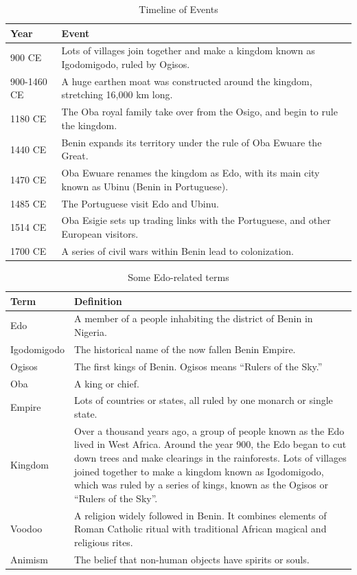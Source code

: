 \begin{table}[htb]
\centering
\caption{Timeline of Events}
\label{tab:timeline}
\begin{tabularx}{\linewidth}{|l|X|}
\hline
\textbf{Year} & \textbf{Event} \\
\hline
900 CE & Lots of villages join together and make a kingdom known as Igodomigodo, ruled by Ogisos. \\
\hline
900-1460 CE & A huge earthen moat was constructed around the kingdom, stretching 16,000 km long. \\
\hline
1180 CE & The Oba royal family take over from the Osigo, and begin to rule the kingdom. \\
\hline
1440 CE & Benin expands its territory under the rule of Oba Ewuare the Great. \\
\hline
1470 CE & Oba Ewuare renames the kingdom as Edo, with its main city known as Ubinu (Benin in Portuguese). \\
\hline
1485 CE & The Portuguese visit Edo and Ubinu. \\
\hline
1514 CE & Oba Esigie sets up trading links with the Portuguese, and other European visitors. \\
\hline
1700 CE & A series of civil wars within Benin lead to colonization. \\
\hline
\end{tabularx}
\end{table}


\begin{table}[htb]
\centering
\caption{Some Edo-related terms}
\label{tab:edo_vocab}
\begin{tabularx}{\linewidth}{|l|X|}
\hline
\textbf{Term} & \textbf{Definition} \\
\hline
Edo & A member of a people inhabiting the district of Benin in Nigeria. \\
\hline
Igodomigodo & The historical name of the now fallen Benin Empire. \\
\hline
Ogisos & The first kings of Benin. Ogisos means “Rulers of the Sky.” \\
\hline
Oba & A king or chief. \\
\hline
Empire & Lots of countries or states, all ruled by one monarch or single state. \\
\hline
Kingdom & Over a thousand years ago, a group of people known as the Edo lived in West Africa. Around the year 900, the Edo began to cut down trees and make clearings in the rainforests. Lots of villages joined together to make a kingdom known as Igodomigodo, which was ruled by a series of kings, known as the Ogisos or “Rulers of the Sky”. \\
\hline
Voodoo & A religion widely followed in Benin. It combines elements of Roman Catholic ritual with traditional African magical and religious rites. \\
\hline
Animism & The belief that non-human objects have spirits or souls. \\
\hline
\end{tabularx}
\end{table}

